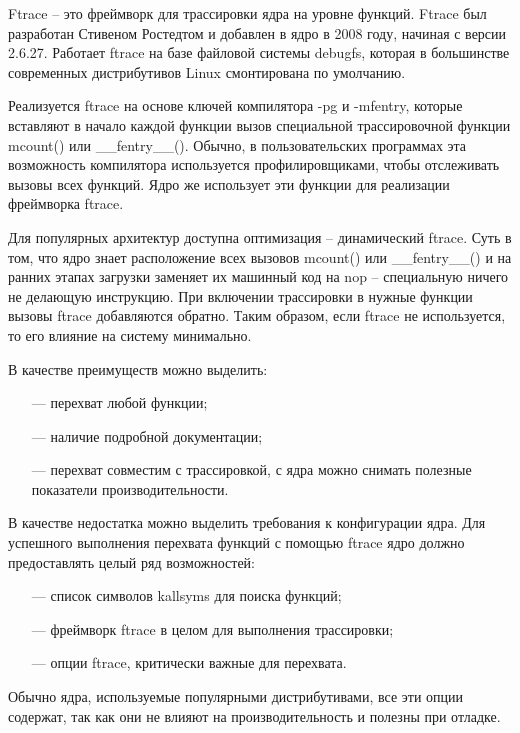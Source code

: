 Ftrace \cite{docftrace} -- это фреймворк для трассировки ядра на уровне функций. Ftrace был разработан Стивеном Ростедтом и добавлен в ядро в 2008 году, начиная с версии 2.6.27. Работает ftrace на базе файловой системы debugfs, которая в большинстве современных дистрибутивов Linux смонтирована по умолчанию.

Реализуется ftrace на основе ключей компилятора -pg и -mfentry, которые вставляют в начало каждой функции вызов специальной трассировочной функции mcount() или \_\_fentry\_\_(). Обычно, в пользовательских программах эта возможность компилятора используется профилировщиками, чтобы отслеживать вызовы всех функций. Ядро же использует эти функции для реализации фреймворка ftrace.

Для популярных архитектур доступна оптимизация -- динамический ftrace. Суть в том, что ядро знает расположение всех вызовов mcount() или \_\_fentry\_\_() и на ранних этапах загрузки заменяет их машинный код на nop -- специальную ничего не делающую инструкцию. При включении трассировки в нужные функции вызовы ftrace добавляются обратно. Таким образом, если ftrace не используется, то его влияние на систему минимально.

В качестве преимуществ можно выделить:

\begin{itemize}[leftmargin=0.7cm +  - ]
	\item[---] перехват любой функции;
	\item[---] наличие подробной документации;
	\item[---] перехват совместим с трассировкой, с ядра можно снимать полезные показатели производительности.
\end{itemize}

В качестве недостатка можно выделить требования к конфигурации ядра. Для успешного выполнения перехвата функций с помощью ftrace ядро должно предоставлять целый ряд возможностей:

\begin{itemize}[leftmargin=0.7cm +  - ]
	\item[---] список символов kallsyms для поиска функций;
	\item[---] фреймворк ftrace в целом для выполнения трассировки;
	\item[---] опции ftrace, критически важные для перехвата.
\end{itemize}

Обычно ядра, используемые популярными дистрибутивами, все эти опции содержат, так как они не влияют на производительность и полезны при отладке.

